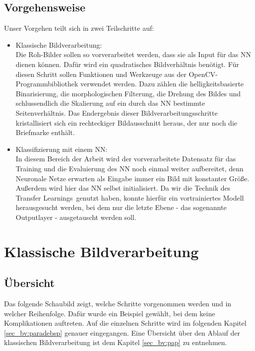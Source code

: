 \documentclass[12pt,toc=bib,toc=listof]{scrreprt}
\begin{document}
\section{Vorgehensweise} %
\label{sec:vorgehensweise}

Unser Vorgehen teilt sich in zwei Teilschritte auf:
\begin{itemize}
\item Klassische Bildverarbeitung:\\ 
Die Roh-Bilder sollen so vorverarbeitet werden, dass sie als Input für das NN dienen können. Dafür wird ein quadratisches Bildverhältnis benötigt. Für diesen Schritt sollen Funktionen und Werkzeuge aus der OpenCV-Programmbibliothek verwendet werden. Dazu zählen die helligkeitsbasierte Binarisierung, die morphologischen Filterung, die Drehung des Bildes und schlussendlich die Skalierung auf ein durch das NN bestimmte Seitenverhältnis. Das Endergebnis dieser Bildverarbeitungsschritte kristallisiert sich ein rechteckiger Bildausschnitt heraus, der nur noch die Briefmarke enthält.

\item Klassifizierung mit einem NN:\\
In diesem Bereich der Arbeit wird der vorverarbeitete Datensatz für das Training und die Evaluierung des NN noch einmal weiter aufbereitet, denn Neuronale Netze erwarten als Eingabe immer ein Bild mit konstanter Größe. Außerdem wird hier das NN selbst initialisiert. Da wir die Technik des \dq Transfer Learnings\dq\ genutzt haben, konnte hierfür ein vortrainiertes Modell herausgesucht werden, bei dem nur die letzte Ebene - das sogenannte Outputlayer - ausgetauscht werden soll.

\end{itemize}



\chapter{Klassische Bildverarbeitung} %
\label{sec:klass_bv}

\section{Übersicht}
\label{sec_bv:übersicht}
Das folgende Schaubild zeigt, welche Schritte vorgenommen werden und in welcher Reihenfolge. Dafür wurde ein Beispiel gewählt, bei dem keine Komplikationen auftreten. Auf die einzelnen Schritte wird im folgenden Kapitel \ref{sec_bv:paradebsp} genauer eingegangen. Eine Übersicht über den Ablauf der klassischen Bildverarbeitung ist dem Kapitel \ref{sec_bv:pap} zu entnehmen.
\end{document}
